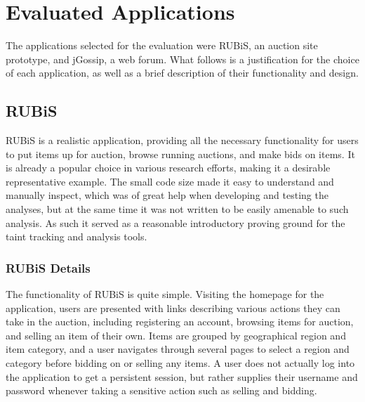 \documentclass[msc,oneside]{ubcthesis}
\begin{document}



\section{Evaluated Applications}
	The applications selected for the evaluation were RUBiS, an auction site prototype, and jGossip, a web forum. What follows is a justification for the choice of each application, as well as a brief description of their functionality and design.
	
\subsection{RUBiS}
RUBiS is a realistic application, providing all the necessary functionality for users to put items up for auction, browse running auctions, and make bids on items. It is already a popular choice in various research efforts, making it a desirable representative example. The small code size made it easy to understand and manually inspect, which was of great help when developing and testing the analyses, but at the same time it was not written to be easily amenable to such analysis. As such it served as a reasonable introductory proving ground for the taint tracking and analysis tools.

\subsubsection{RUBiS Details}
The functionality of RUBiS is quite simple. Visiting the homepage for the application, users are presented with links describing various actions they can take in the auction, including registering an account, browsing items for auction, and selling an item of their own. Items are grouped by geographical region and item category, and a user navigates through several pages to select a region and category before bidding on or selling any items. A user does not actually log into the application to get a persistent session, but rather supplies their username and password whenever taking a sensitive action such as selling and bidding.\\
\end{document}
